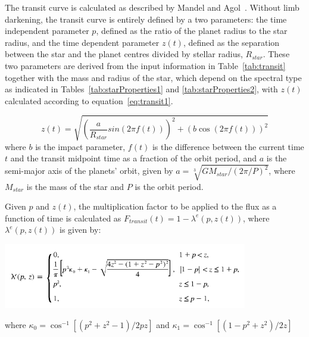 \documentclass[11pt]{article}      %
\begin{document}
The transit curve is calculated as described by Mandel and Agol~\cite{MandelAgol}.  Without limb darkening, the transit curve is entirely defined by a two parameters: the time independent parameter $p$, defined as the ratio of the planet radius to the star radius, and the time dependent parameter $z(t)$, defined as the separation between the star and the planet centres divided by stellar radius, $R_{star}$.  These two parameters are derived from the input information in Table~\ref{tab:transit} together with the mass and radius of the star, which depend on the spectral type as indicated in Tables~\ref{tab:starProperties1} and \ref{tab:starProperties2}, with $z(t)$ calculated according to equation~\ref{eq:transit1}.

\begin{equation}
z(t)=\sqrt{\left(\frac{a}{R_{star}}sin(2\pi f(t))\right)^2 + (b\cos(2\pi f(t)))^2}
\label{eq:transit1}
\end{equation}
where $b$ is the impact parameter, $f(t)$ is the difference between the current time $t$ and the transit midpoint time as a fraction of the orbit period, and $a$ is the semi-major axis of the planets' orbit, given by $a=\sqrt[3]{G M_{star}/\left(2\pi/P\right)^2}$, where $M_{star}$ is the mass of the star and $P$ is the orbit period.

Given $p$ and $z(t)$, the multiplication factor to be applied to the flux as a function of time is calculated as $F_{transit}(t)=1-\lambda^e(p,z(t))$, where $\lambda^e(p,z(t))$ is given by:

\includegraphics[width=0.8\textwidth]{transitEquation.png}

where $\kappa_0=\cos^{-1}[(p^2+z^2-1)/2pz]$ and $\kappa_1=\cos^{-1}[(1-p^2+z^2)/2z]$
\end{document}
